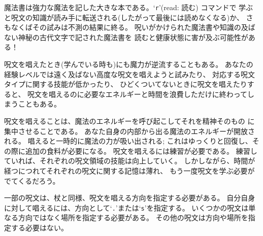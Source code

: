 魔法書は強力な魔法を記した大きな本である。`{\tt r}'(read: 読む) コマンドで
学ぶと呪文の知識が読み手に転送される(したがって最後には読めなくなる)か、
さもなくばその試みは不測の結果に終る。
呪いがかけられた魔法書や知識の及ばない神秘の古代文字で記された魔法書を
読むと健康状態に害が及ぶ可能性がある！

呪文を唱えたとき(学んでいる時も)にも魔力が逆流することもある。
あなたの経験レベルでは遠く及ばない高度な呪文を唱えようと試みたり、
対応する呪文タイプに関する技能が低かったり、
ひどくついてないときに呪文を唱えたりすると、
呪文を唱えるのに必要なエネルギーと時間を浪費しただけに終わってしまうこともある。

呪文を唱えることは、魔法のエネルギーを呼び起こしてそれを精神そのもの
に集中させることである。
あなた自身の内部から出る魔法のエネルギーが開放される。
唱えると一時的に魔法の力が吸い出される;
これはゆっくりと回復し、その際に追加の食料が必要になる。
呪文を唱えるには練習が必要である。
練習していれば、それぞれの呪文領域の技能は向上していく。
しかしながら、時間が経つにつれてそれぞれの呪文に関する記憶は薄れ、
もう一度呪文を学ぶ必要がでてくるだろう。

一部の呪文は、杖と同様、呪文を唱える方向を指定する必要がある。
自分自身に対して唱えるには、方向として`{\tt .}'または`{\tt s}'を指定する。
いくつかの呪文は単なる方向ではなく場所を指定する必要がある。
その他の呪文は方向や場所を指定する必要はない。

